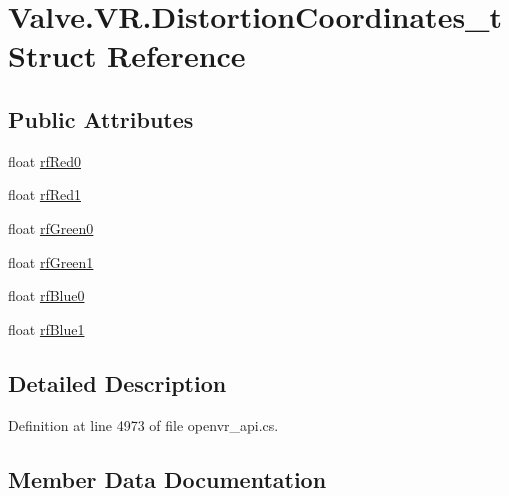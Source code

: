 \hypertarget{struct_valve_1_1_v_r_1_1_distortion_coordinates__t}{}\section{Valve.\+V\+R.\+Distortion\+Coordinates\+\_\+t Struct Reference}
\label{struct_valve_1_1_v_r_1_1_distortion_coordinates__t}
\subsection*{Public Attributes}
\begin{DoxyCompactItemize}
\item 
float \mbox{\hyperlink{struct_valve_1_1_v_r_1_1_distortion_coordinates__t_a9fb8f14958cc0bed1310e89b6eadeb53}{rf\+Red0}}
\item 
float \mbox{\hyperlink{struct_valve_1_1_v_r_1_1_distortion_coordinates__t_ac07d53966ee3e9585191bcedf7db44cb}{rf\+Red1}}
\item 
float \mbox{\hyperlink{struct_valve_1_1_v_r_1_1_distortion_coordinates__t_a4d4078c3031908ab2dc0159c0fde1491}{rf\+Green0}}
\item 
float \mbox{\hyperlink{struct_valve_1_1_v_r_1_1_distortion_coordinates__t_a1e968655e84aa788ddcb59c82b97e0b5}{rf\+Green1}}
\item 
float \mbox{\hyperlink{struct_valve_1_1_v_r_1_1_distortion_coordinates__t_acb2357c61b4ea2f12332a88ccde0f181}{rf\+Blue0}}
\item 
float \mbox{\hyperlink{struct_valve_1_1_v_r_1_1_distortion_coordinates__t_a6b3026507a5e4fcf2656a80af3429aef}{rf\+Blue1}}
\end{DoxyCompactItemize}


\subsection{Detailed Description}


Definition at line 4973 of file openvr\+\_\+api.\+cs.



\subsection{Member Data Documentation}
\mbox{\label{struct_valve_1_1_v_r_1_1_distortion_coordinates__t_acb2357c61b4ea2f12332a88ccde0f181}} 
